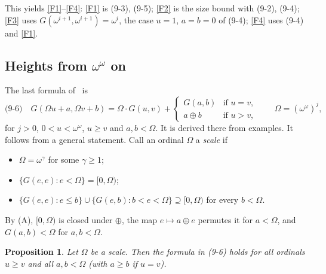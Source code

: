 \documentclass[11pt]{amsart}
\newtheorem{proposition}[theorem]{Proposition}
\theoremstyle{definition}
\theoremstyle{remark}
\newcommand{\G}{G}
\newcommand{\nim}{\oplus}
\begin{document}
This yields \ref{F1}--\ref{F4}: \ref{F1} is (9-3), (9-5); \ref{F2} is the size bound with (9-2),
(9-4); \ref{F3} uses $\G(\omega^{i+1},\omega^{i+1})=\omega^i$, the case $u=1$, $a=b=0$ of (9-4);
\ref{F4} uses (9-4) and \ref{F1}.

\subsection*{Heights from $\omega^\omega$ on}
The last formula of~\cite[\S9]{HS} is
\[
\text{(9-6)}\quad \G(\Omega u+a,\Omega v+b)=\Omega\cdot\G(u,v)+
\begin{cases}\G(a,b)&\text{if }u=v,\\ a\nim b&\text{if }u>v,\end{cases}
\qquad \Omega=(\omega^\omega)^j,
\]
for $j>0$, $0<u<\omega^\omega$, $u\ge v$ and $a,b<\Omega$. It is derived there from examples. It
follows from a general statement. Call an ordinal $\Omega$ a \emph{scale} if
\begin{itemize}
\item[(A)] $\Omega=\omega^\gamma$ for some $\gamma\ge1$;
\item[(D)] $\{\G(e,e):e<\Omega\}=[0,\Omega)$;
\item[(B)] $\{\G(e,e):e\le b\}\cup\{\G(e,b):b<e<\Omega\}\supseteq[0,\Omega)$ for every
  $b<\Omega$.
\end{itemize}
By (A), $[0,\Omega)$ is closed under $\nim$, the map $e\mapsto a\nim e$ permutes it for
$a<\Omega$, and $\G(a,b)<\Omega$ for $a,b<\Omega$.

\begin{proposition}\label{prop:scale}
Let $\Omega$ be a scale. Then the formula in \textup{(9-6)} holds for all ordinals $u\ge v$ and
all $a,b<\Omega$ (with $a\ge b$ if $u=v$).
\end{proposition}
\end{document}

